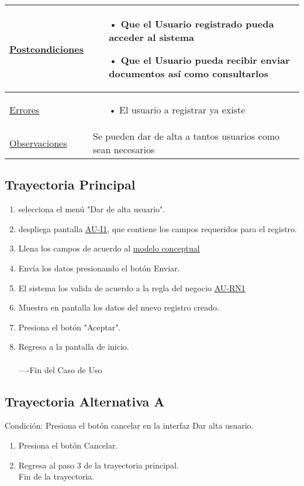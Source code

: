\begin{longtable}{p{4cm}|p{11cm}}
				\hline
					{\hyperlink {Postcondiciones}{Postcondiciones}}&{
					\begin{itemize}
						\item[•] Que el Usuario registrado pueda acceder al sistema
						\item[•] Que el Usuario pueda recibir enviar documentos as\'i como consultarlos
						\end{itemize}	
						}\\
				\hline
					{\hyperlink {Errores}{Errores}}&{
					\begin{itemize}
						\item[•]El usuario a registrar ya existe
					\end{itemize}		
					}\\
				\hline
					{\hyperlink {Observaciones}{Observaciones}}&{Se pueden dar de alta a tantos usuarios como sean necesarios}\\
				\end{longtable}

\newpage
	\subsection {Trayectoria Principal}
		\begin {enumerate}
			\item \UCactor selecciona el men\'u "Dar de alta usuario".
			\item \UCsist despliega pantalla \hyperlink{AU-I1}{AU-I1}, que contiene los campos requeridos para el registro.
			\item \UCactor Llena los campos de acuerdo al \hyperlink{MC}{modelo conceptual} 
			\item \UCactor Env\'ia los datos presionando el bot\'on   Enviar.
			\item \UCsist El sistema los valida de acuerdo a la regla del negocio \hyperlink {AU-RN1} {AU-RN1}
			\item \UCsist Muestra en pantalla los datos del nuevo registro creado.
			\item \UCactor Presiona el bot\'on "Aceptar".
			\item \UCsist Regresa a la pantalla de inicio.
			\\
			\\
			----Fin del Caso de Uso
		\end{enumerate}

	\subsection {Trayectoria Alternativa A}
		Condici\'on: Presiona el bot\'on cancelar en la interfaz Dar alta usuario.
			\\
		\begin {enumerate}
			\item Presiona el bot\'on Cancelar.
			\item Regresa al paso 3 de la trayectoria principal.
			\\
			Fin de la trayectoria.
			\\
	\end{enumerate}